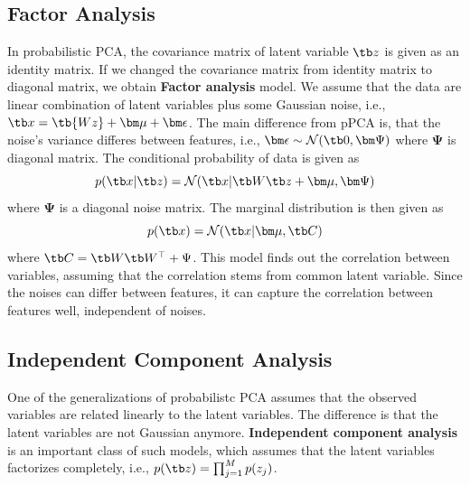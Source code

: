 \documentclass{article}
\begin{document}
    \subsection{Factor Analysis}
        In probabilistic PCA, the covariance matrix of latent variable $\tb z$ is given as an identity matrix. If we changed the covariance matrix from identity matrix to diagonal matrix,
        we obtain \textbf{Factor analysis} model. We assume that the data are linear combination of latent variables plus some Gaussian noise, i.e., $\tb x = \tb{Wz} + \bm\mu + \bm\epsilon$.
        The main difference from pPCA is, that the noise's variance differes between features, i.e., $\bm\epsilon \sim \mathcal{N}(\tb 0, \bm\Psi)$ where $\bm\Psi$ is diagonal matrix.
        The conditional probability of data is given as
        \[
        p(\tb x| \tb z)=\mathcal{N}(\tb x|\tb W \tb z + \bm\mu, \bm\Psi)
        \]
        where $\bm\Psi$ is a diagonal noise matrix. The marginal distribution is then given as
        \[
        p(\tb x)=\mathcal{N}(\tb x|\bm\mu,\tb C)
        \]
        where $\tb C=\tb W\tb W^\top + \Psi$. This model finds out the correlation between variables, assuming that the correlation stems from common latent variable.
        Since the noises can differ between features, it can capture the correlation between features well, independent of noises.
    \subsection{Independent Component Analysis}
        One of the generalizations of probabilistc PCA assumes that the observed variables are related linearly to the latent variables. The difference is that
        the latent variables are not Gaussian anymore. \textbf{Independent component analysis} is an important class of such models, which assumes that the latent variables
        factorizes completely, i.e., $p(\tb z) = \prod_{j=1}^{M}p(z_j)$.
\end{document}
